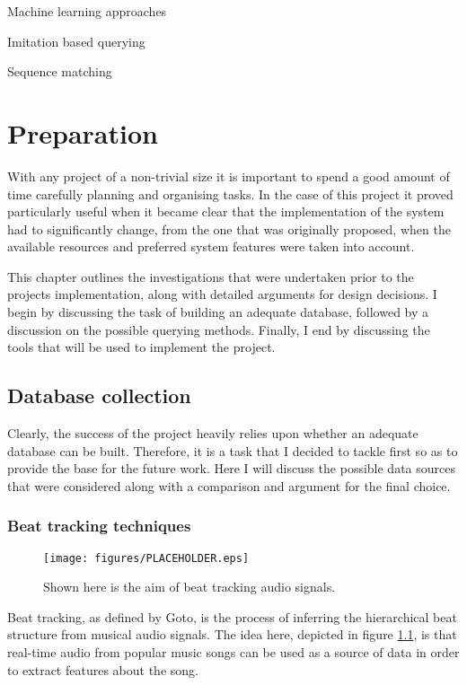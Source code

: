 \documentclass[12pt,twoside,notitlepage]{report}
\begin{document}
	Machine learning approaches

	Imitation based querying

	Sequence matching

\cleardoublepage

\chapter{Preparation}

	With any project of a non-trivial size it is important to spend a good amount of time carefully planning and organising tasks. In the case of this project it proved particularly useful when it became clear that the implementation of the system had to significantly change, from the one that was originally proposed, when the available resources and preferred system features were taken into account.
	
	This chapter outlines the investigations that were undertaken prior to the projects implementation, along with detailed arguments for design decisions. I begin by discussing the task of building an adequate database, followed by a discussion on the possible querying methods. Finally, I end by discussing the tools that will be used to implement the project.
	
	\section{Database collection}
	
	Clearly, the success of the project heavily relies upon whether an adequate database can be built. Therefore, it is a task that I decided to tackle first so as to provide the base for the future work. Here I will discuss the possible data sources that were considered along with a comparison and argument for the final choice.
	
		\subsection{Beat tracking techniques}
		
		\begin{figure}[h]
			\centerline{\texttt{[image: figures/PLACEHOLDER.eps]}}
			\caption{\label{beatTracking} Shown here is the aim of beat tracking audio signals.}
\end{figure}

		Beat tracking, as defined by Goto\cite{Goto2001}, is the process of inferring the hierarchical beat structure from musical audio signals. The idea here, depicted in figure \ref{beatTracking}, is that real-time audio from popular music songs can be used as a source of data in order to extract features about the song. 
		
\end{document}
